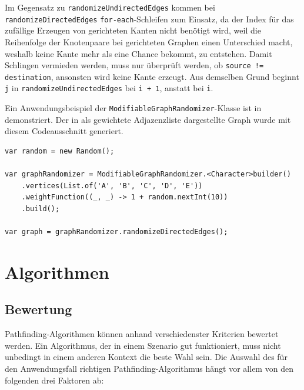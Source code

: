             Im Gegensatz zu \lstinline{randomizeUndirectedEdges} kommen bei \lstinline{randomizeDirectedEdges} \lstinline{for-each}-Schleifen zum Einsatz, da der Index für das zufällige Erzeugen von gerichteten Kanten nicht benötigt wird, weil die Reihenfolge der Knotenpaare bei gerichteten Graphen einen Unterschied macht, weshalb keine Kante mehr als eine Chance bekommt, zu entstehen. Damit Schlingen vermieden werden, muss nur überprüft werden, ob \lstinline{source != destination}, ansonsten wird keine Kante erzeugt. Aus demselben Grund beginnt \lstinline{j} in \lstinline{randomizeUndirectedEdges} bei \lstinline{i + 1}, anstatt bei \lstinline{i}.

            

            Ein Anwendungsbeispiel der \lstinline{ModifiableGraphRandomizer}-Klasse ist in  demonstriert. Der in  als gewichtete Adjazenzliste dargestellte Graph wurde mit diesem Codeausschnitt generiert.
            
            \begin{lstlisting}[caption=Beispielanwendung der Klasse aus \lil{lst:modifiable-graph-randomizer}, label=lst:modifiable-graph-randomizer-example]
var random = new Random();

var graphRandomizer = ModifiableGraphRandomizer.<Character>builder()
    .vertices(List.of('A', 'B', 'C', 'D', 'E'))
    .weightFunction((_, _) -> 1 + random.nextInt(10))
    .build();

var graph = graphRandomizer.randomizeDirectedEdges();
            \end{lstlisting}

    \section{Algorithmen}

        \subsection{Bewertung}

            Pathfinding-Algorithmen können anhand verschiedenster Kriterien bewertet werden. Ein Algorithmus, der in einem Szenario gut funktioniert, muss nicht unbedingt in einem anderen Kontext die beste Wahl sein. Die Auswahl des für den Anwendungsfall richtigen Pathfinding-Algorithmus hängt vor allem von den folgenden drei Faktoren ab:
            
